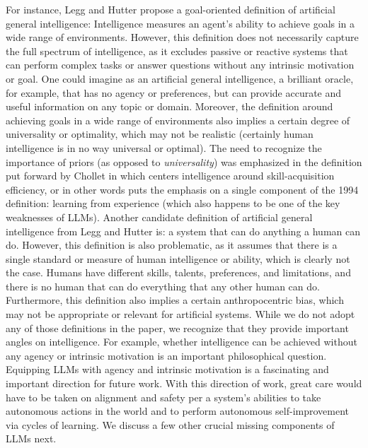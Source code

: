 For instance, Legg and Hutter \cite{legg2008machine} propose a goal-oriented definition of artificial general intelligence: Intelligence measures an agent’s ability to achieve goals in a wide range of environments. However, this definition does not necessarily capture the full spectrum of intelligence, as it excludes passive or reactive systems that can perform complex tasks or answer questions without any intrinsic motivation or goal. One could imagine as an artificial general intelligence, a brilliant oracle, for example, that has no agency or preferences, but can provide accurate and useful information on any topic or domain. Moreover, the definition around achieving goals in a wide range of environments also implies a certain degree of universality or optimality, which may not be realistic (certainly human intelligence is in no way universal or optimal). The need to recognize the importance of priors (as opposed to {\em universality}) was emphasized in the definition put forward by Chollet in \cite{chollet2019measure} which centers intelligence around skill-acquisition efficiency, or in other words puts the emphasis on a single component of the 1994 definition: learning from experience (which also happens to be one of the key weaknesses of LLMs). Another candidate definition of artificial general intelligence from Legg and Hutter \cite{legg2007universal} is: a system that can do anything a human can do. However, this definition is also problematic, as it assumes that there is a single standard or measure of human intelligence or ability, which is clearly not the case. Humans have different skills, talents, preferences, and limitations, and there is no human that can do everything that any other human can do. Furthermore, this definition also implies a certain anthropocentric bias, which may not be appropriate or relevant for artificial systems. While we do not adopt any of those definitions in the paper, we recognize that they provide important angles on intelligence. For example, whether intelligence can be achieved without any agency or intrinsic motivation is an important philosophical question. Equipping LLMs with agency and intrinsic motivation is a fascinating and important direction for future work. With this direction of work, great care would have to be taken on alignment and safety per a system's abilities to take autonomous actions in the world and to perform autonomous self-improvement via cycles of learning. We discuss a few other crucial missing components of LLMs next.

